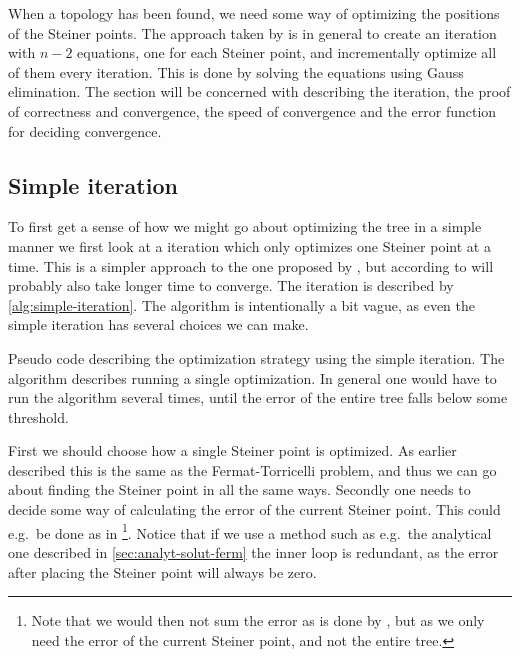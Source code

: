 When a topology has been found, we need some way of optimizing the positions of the
Steiner points. The approach taken by \citeauthor{smith1992} is in general to create an
iteration with $n-2$ equations, one for each Steiner point, and incrementally
optimize all of them every iteration. This is done by solving the equations
using Gauss elimination. The section will be concerned with describing the
iteration, the proof of correctness and convergence, the speed of convergence
and the error function for deciding convergence.

\subsection{Simple iteration}
\label{sec:simple-iteration}

To first get a sense of how we might go about optimizing the tree in a simple
manner we first look at a iteration which only optimizes one Steiner point at a
time. This is a simpler approach to the one proposed by \textcite{smith1992},
but according to \citeauthor{smith1992} will probably also take longer time to
converge. The iteration is described by \cref{alg:simple-iteration}. The
algorithm is intentionally a bit vague, as even the simple iteration has several
choices we can make.

\begin{algorithm}[htbp]
  \caption[Simple iteration]{Pseudo code describing the optimization strategy
    using the simple iteration. The algorithm describes running a single
    optimization. In general one would have to run the algorithm several times,
    until the error of the entire tree falls below some threshold.\label{alg:simple-iteration}}
\end{algorithm}

First we should choose how a single Steiner point is optimized. As earlier
described this is the same as the Fermat-Torricelli problem, and thus we can go
about finding the Steiner point in all the same ways. Secondly one needs to
decide some way of calculating the error of the current Steiner point. This
could e.g.\ be done as in \textcite{smith1992}\footnote{Note that we would then
  not sum the error as is done by \citeauthor{smith1992}, but as we only need
  the error of the current Steiner point, and not the entire tree.}.  Notice
that if we use a method such as e.g.\ the analytical one described in
\cref{sec:analyt-solut-ferm} the inner loop is redundant, as the error after
placing the Steiner point will always be zero.

